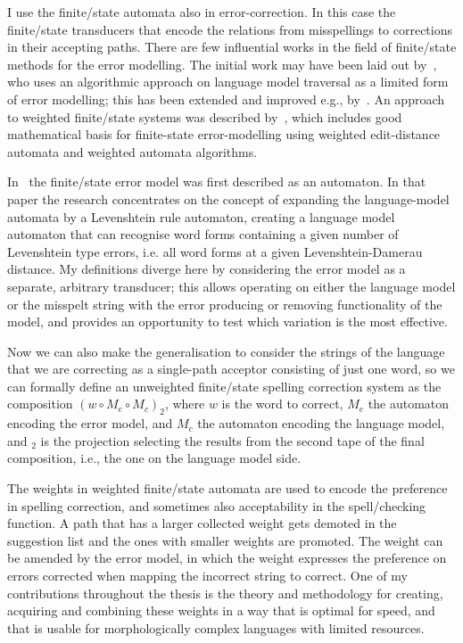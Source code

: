 \documentclass[officiallayout]{unihelcompling}
\begin{document}
I use the finite\-/state automata also in error-correction. In this case the
finite\-/state transducers that encode the relations from
misspellings to corrections in their accepting paths. There are few influential
works in the field of finite\-/state methods for the error modelling. The
initial work may have been laid out by~\citet{oflazer1996errortolerant}, who
uses an algorithmic approach on language model traversal as a limited form of
error modelling; this has been extended and improved e.g.,
by~\citet{hulden2009fast}.  An approach to weighted finite\-/state systems was
described by~\citet{mohri2003edit}, which includes good mathematical basis for
finite-state error-modelling using weighted edit-distance automata and weighted
automata algorithms. 

In~\citet{agata2002typographical} the finite\-/state error model was first
described as an automaton. In that paper the research concentrates on the
concept of expanding the language-model automata by a Levenshtein rule
automaton, creating a language model automaton that can recognise word forms
containing a given number of Levenshtein type errors, i.e. all word forms at a
given Levenshtein-Damerau distance. My definitions diverge here by considering
the error model as a separate, arbitrary transducer; this allows
operating on either the language model or the misspelt string with the error
producing or removing functionality of the model, and provides an opportunity
to test which variation is the most effective. 

Now we can also make the generalisation to consider the strings of the language
that we are correcting as a single-path acceptor consisting of
just one word, so we can formally define an unweighted finite\-/state spelling
correction system as the composition $(w \circ M_e \circ M_c)_2$, where $w$ is
the word to correct, $M_e$ the automaton encoding the error model, and $M_c$
the automaton encoding the language model, and $_2$ is the projection selecting
the results from the second tape of the final composition, i.e., the one on the
language model side.

The weights in weighted finite\-/state automata are used to encode the preference
in spelling correction, and sometimes also acceptability in the
spell\-/checking function. A path that has a larger collected weight gets
demoted in the suggestion list and the ones with smaller weights are promoted.
The weight can be amended by the error model, in which the weight expresses the
preference on errors corrected when mapping the incorrect string to correct.
One of my contributions throughout the thesis is the theory and methodology for
creating, acquiring and combining these weights in a way that is optimal for
speed, and that is usable for morphologically complex languages with limited
resources.
\end{document}
